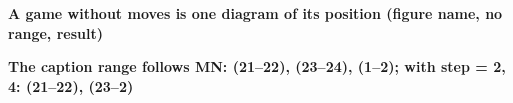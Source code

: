 \documentclass{article}
\newcommand\case[1]{\par\medskip\noindent\textbf{#1}\par\nopagebreak}
\begin{document}
\case{A game without moves is one diagram of its position (figure name, no range, result)}

\case{The caption range follows MN: (21--22), (23--24), (1--2); with step = {2, 4}: (21--22), (23--2)}
\end{document}
